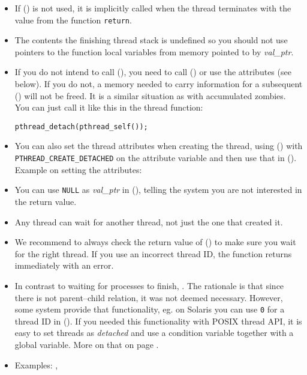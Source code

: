 \begin{itemize}
\item If () is not used, it is implicitly called when the
thread terminates with the value from the function \texttt{return}.
\item The contents the finishing thread stack is undefined so you should not use
pointers to the function local variables from memory pointed to by
\emph{val\_ptr}.
\item If you do not intend to call (), you need to call
() or use the attributes (see below).  If you do not, a
memory needed to carry information for a subsequent () will
not be freed.  It is a similar situation as with accumulated zombies.  You can
just call it like this in the thread function:
\begin{alltt}
pthread\_detach(pthread\_self());
\end{alltt}
\item You can also set the thread attributes when creating the thread, using
() with
\texttt{PTHREAD\_CREATE\_DETACHED} on the attribute variable and then use that
in ().  Example on setting the attributes:
\item You can use \texttt{NULL} as \emph{val\_ptr} in (),
telling the system you are not interested in the return value.
\item Any thread can wait for another thread, not just the one that created it.
\item We recommend to always check the return value of ()
to make sure you wait for the right thread.  If you use an incorrect thread ID,
the function returns immediately with an error.
\item In contrast to waiting for processes to finish, .  The rationale is that since there is not parent--child
relation, it was not deemed necessary.  However, some system provide that
functionality, eg.  on Solaris you can use \texttt{0} for a thread ID in
().  If you needed this functionality with POSIX thread API, it
is easy to set threads as \emph{detached} and use a condition variable together
with a global variable.  More on that on page \pageref{CONDITION_VARIABLES}.
\item \label{PTHREAD_JOIN} Examples: ,
\end{itemize}



